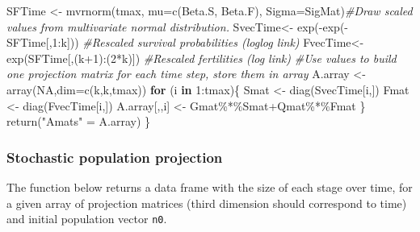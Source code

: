 \documentclass[
]{book}
\newenvironment{Shaded}{\begin{snugshade}}{\end{snugshade}}
\newcommand{\AttributeTok}[1]{\textcolor[rgb]{0.77,0.63,0.00}{#1}}
\newcommand{\CommentTok}[1]{\textcolor[rgb]{0.56,0.35,0.01}{\textit{#1}}}
\newcommand{\ConstantTok}[1]{\textcolor[rgb]{0.00,0.00,0.00}{#1}}
\newcommand{\ControlFlowTok}[1]{\textcolor[rgb]{0.13,0.29,0.53}{\textbf{#1}}}
\newcommand{\DecValTok}[1]{\textcolor[rgb]{0.00,0.00,0.81}{#1}}
\newcommand{\FunctionTok}[1]{\textcolor[rgb]{0.00,0.00,0.00}{#1}}
\newcommand{\NormalTok}[1]{#1}
\newcommand{\OtherTok}[1]{\textcolor[rgb]{0.56,0.35,0.01}{#1}}
\newcommand{\SpecialCharTok}[1]{\textcolor[rgb]{0.00,0.00,0.00}{#1}}
\newcommand{\StringTok}[1]{\textcolor[rgb]{0.31,0.60,0.02}{#1}}
\begin{document}
\begin{Shaded}
\begin{Highlighting}[]
\NormalTok{  SFTime }\OtherTok{\textless{}{-}} \FunctionTok{mvrnorm}\NormalTok{(tmax, }\AttributeTok{mu=}\FunctionTok{c}\NormalTok{(Beta.S, Beta.F), }\AttributeTok{Sigma=}\NormalTok{SigMat)}\CommentTok{\#Draw scaled values from multivariate normal distribution.}
\NormalTok{  SvecTime}\OtherTok{\textless{}{-}}   \FunctionTok{exp}\NormalTok{(}\SpecialCharTok{{-}}\FunctionTok{exp}\NormalTok{(}\SpecialCharTok{{-}}\NormalTok{SFTime[,}\DecValTok{1}\SpecialCharTok{:}\NormalTok{k])) }\CommentTok{\#Rescaled survival probabilities (loglog link)}
\NormalTok{  FvecTime}\OtherTok{\textless{}{-}} \FunctionTok{exp}\NormalTok{(SFTime[,(k}\SpecialCharTok{+}\DecValTok{1}\NormalTok{)}\SpecialCharTok{:}\NormalTok{(}\DecValTok{2}\SpecialCharTok{*}\NormalTok{k)]) }\CommentTok{\#Rescaled fertilities  (log link)}
\CommentTok{\#Use values to build one projection matrix for each time step, store them in  array}
\NormalTok{  A.array }\OtherTok{\textless{}{-}} \FunctionTok{array}\NormalTok{(}\ConstantTok{NA}\NormalTok{,}\AttributeTok{dim=}\FunctionTok{c}\NormalTok{(k,k,tmax))}
  \ControlFlowTok{for}\NormalTok{ (i }\ControlFlowTok{in} \DecValTok{1}\SpecialCharTok{:}\NormalTok{tmax)\{}
\NormalTok{    Smat }\OtherTok{\textless{}{-}} \FunctionTok{diag}\NormalTok{(SvecTime[i,])}
\NormalTok{    Fmat }\OtherTok{\textless{}{-}} \FunctionTok{diag}\NormalTok{(FvecTime[i,])}
\NormalTok{    A.array[,,i] }\OtherTok{\textless{}{-}}\NormalTok{   Gmat}\SpecialCharTok{\%*\%}\NormalTok{Smat}\SpecialCharTok{+}\NormalTok{Qmat}\SpecialCharTok{\%*\%}\NormalTok{Fmat}
\NormalTok{  \}}
\FunctionTok{return}\NormalTok{(}\StringTok{"Amats"} \OtherTok{=}\NormalTok{ A.array)}
\NormalTok{\}}
\end{Highlighting}
\end{Shaded}

\hypertarget{stochastic-population-projection}{%
\subsubsection{Stochastic population projection}\label{stochastic-population-projection}}

The function below returns a data frame with the size of each stage over time, for a given array of projection matrices (third dimension should correspond to time) and initial population vector \texttt{n0}.
\end{document}
